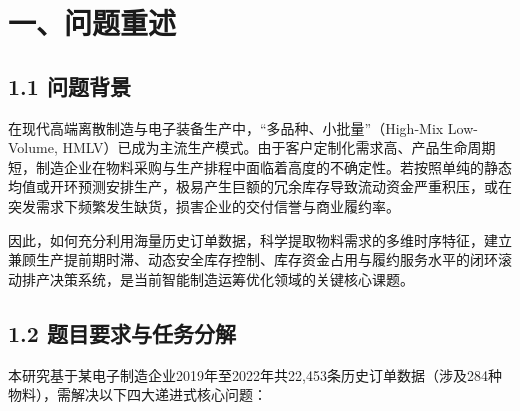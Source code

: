 \section{一、问题重述}\label{ux4e00ux95eeux9898ux91cdux8ff0}

\subsection{1.1 问题背景}\label{ux95eeux9898ux80ccux666f}

在现代高端离散制造与电子装备生产中，``多品种、小批量''（High-Mix
Low-Volume,
HMLV）已成为主流生产模式。由于客户定制化需求高、产品生命周期短，制造企业在物料采购与生产排程中面临着高度的不确定性。若按照单纯的静态均值或开环预测安排生产，极易产生巨额的冗余库存导致流动资金严重积压，或在突发需求下频繁发生缺货，损害企业的交付信誉与商业履约率。

因此，如何充分利用海量历史订单数据，科学提取物料需求的多维时序特征，建立兼顾生产提前期时滞、动态安全库存控制、库存资金占用与履约服务水平的闭环滚动排产决策系统，是当前智能制造运筹优化领域的关键核心课题。

\subsection{1.2
题目要求与任务分解}\label{ux9898ux76eeux8981ux6c42ux4e0eux4efbux52a1ux5206ux89e3}

本研究基于某电子制造企业2019年至2022年共22,453条历史订单数据（涉及284种物料），需解决以下四大递进式核心问题：


